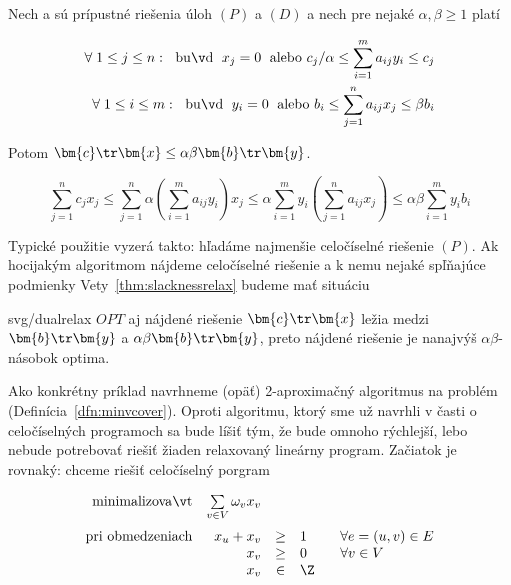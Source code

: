 \begin{framed}
\begin{veta}
  \label{thm:slacknessrelax}
   Nech  a  sú prípustné riešenia úloh $(P)$ a $(D)$ a nech pre nejaké 
   $\alpha,\beta\ge1$ platí

\begin{eqnarray*}
  \forall\;1\le j\le n:\;{\rm\ buď\ }\; x_j=0\; {\rm\ alebo\ }c_j/\alpha\le\sum_{i=1}^ma_{ij}y_i\le c_j\\
  \forall\;1\le i\le m:\;{\rm\ buď\ }\; y_i=0\; {\rm\ alebo\ }b_i\le\sum_{j=1}^na_{ij}x_j\le\beta b_i
\end{eqnarray*}

\noindent
Potom $\bm{c}\tr\bm{x}\le\alpha\beta\bm{b}\tr\bm{y}$.
\end{veta}
\end{framed}

\begin{dokaz}
  $$\sum_{j=1}^nc_jx_j\le\sum_{j=1}^n\alpha\left(\sum_{i=1}^ma_{ij}y_i\right)x_j
  \le\alpha\sum_{i=1}^my_i\left(\sum_{j=1}^na_{ij}x_j\right)\le\alpha\beta\sum_{i=1}^my_ib_i
  $$
\end{dokaz}

\noindent
Typické použitie vyzerá takto: hľadáme najmenšie celočíselné riešenie $(P)$. Ak hocijakým algoritmom nájdeme
celočíselné riešenie  a k nemu nejaké  spľňajúce podmienky Vety~\ref{thm:slacknessrelax} budeme
mať situáciu

\begin{myfig}{\textwidth}{svg/dualrelax}
  $OPT$ aj nájdené riešenie $\bm{c}\tr\bm{x}$ ležia medzi $\bm{b}\tr\bm{y}$ a $\alpha\beta\bm{b}\tr\bm{y}$,
  preto nájdené riešenie je nanajvýš $\alpha\beta$-násobok optima.
\end{myfig}

\noindent
Ako konkrétny príklad navrhneme (opäť) 2-aproximačný algoritmus na problém \minvcover 
(Definícia~\ref{dfn:minvcover}). Oproti algoritmu, ktorý sme už navrhli v časti o celočíselných programoch
sa bude líšiť tým, že bude omnoho rýchlejší, lebo nebude potrebovať riešiť žiaden relaxovaný 
lineárny program. Začiatok je rovnaký: chceme riešiť celočíselný porgram

\edef\tmp{\theequation}

\addtocounter{equation}{-1}


\begin{equation}
\begin{array}{rrcll}
  {\rm minimalizovať}     & \multicolumn{1}{l}{\sum\limits_{v\in V}\omega_vx_v}\\[3ex]
  {\rm pri\ obmedzeniach} & x_u + x_v&\ge&1& \;\;\;\forall e=(u,v)\in E\\
                          & x_v&\ge&0& \;\;\;\forall v\in V\\
                          & x_v&\in&\Z
\end{array}
\end{equation}

